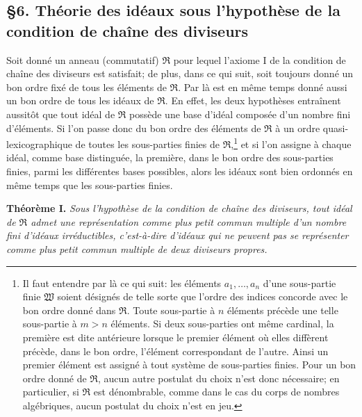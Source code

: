 \providecommand{\mR}{\mathfrak{R}}
\providecommand{\ma}{\mathfrak{a}}
\providecommand{\mb}{\mathfrak{b}}
\providecommand{\mc}{\mathfrak{c}}
\providecommand{\mm}{\mathfrak{m}}
\providecommand{\mt}{\mathfrak{t}}

\subsection*{\S{}6. Théorie des idéaux sous l'hypothèse de la condition de chaîne des diviseurs}

Soit donné un anneau (commutatif) $\mR$ pour lequel l'axiome I de la condition de chaîne des diviseurs est satisfait; de plus, dans ce qui suit, soit toujours donné un bon ordre fixé de tous les éléments de $\mR$. Par là est en même temps donné aussi un bon ordre de tous les idéaux de $\mR$. En effet, les deux hypothèses entraînent aussitôt que tout idéal de $\mR$ possède une base d'idéal composée d'un nombre fini d'éléments. Si l'on passe donc du bon ordre des éléments de $\mR$ à un ordre quasi-lexicographique de toutes les sous-parties finies de $\mR$,\footnote{Il faut entendre par là ce qui suit: les éléments $a_1,\ldots,a_n$ d'une sous-partie finie $\mathfrak W$ soient désignés de telle sorte que l'ordre des indices concorde avec le bon ordre donné dans $\mR$. Toute sous-partie à $n$ éléments précède une telle sous-partie à $m>n$ éléments. Si deux sous-parties ont même cardinal, la première est dite antérieure lorsque le premier élément où elles diffèrent précède, dans le bon ordre, l'élément correspondant de l'autre. Ainsi un premier élément est assigné à tout système de sous-parties finies. Pour un bon ordre donné de $\mR$, aucun autre postulat du choix n'est donc nécessaire; en particulier, si $\mR$ est dénombrable, comme dans le cas du corps de nombres algébriques, aucun postulat du choix n'est en jeu.} et si l'on assigne à chaque idéal, comme base distinguée, la première, dans le bon ordre des sous-parties finies, parmi les différentes bases possibles, alors les idéaux sont bien ordonnés en même temps que les sous-parties finies.

\textbf{Théorème I.} \emph{Sous l'hypothèse de la condition de chaîne des diviseurs, tout idéal de $\mR$ admet une représentation comme plus petit commun multiple d'un nombre fini d'idéaux irréductibles, c'est-à-dire d'idéaux qui ne peuvent pas se représenter comme plus petit commun multiple de deux diviseurs propres.}

